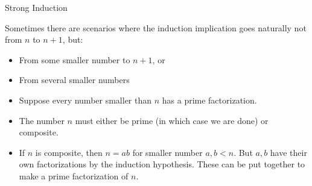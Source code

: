 \documentclass[10pt]{beamer}
\begin{document}
\begin{frame}{Strong Induction}
%

 \begin{myredbox}[title=When to Use Strong Induction]
 Sometimes there are scenarios where the induction implication goes naturally not from $n$ to $n+1$, but:
 \begin{itemize}
 \item From some smaller number to $n+1$, or
 \item From several smaller numbers	
 \end{itemize}
 \end{myredbox}

\vfill 
\pause 
 \begin{myyellowbox}[title=Example: Every positive integer has a prime factorization]
 \begin{itemize}
 \item Suppose every number smaller than $n$ has a prime factorization.
 \item The number $n$ must either be prime (in which case we are done) or composite.
 \item If $n$ is composite, then $n=ab$ for smaller number $a,b<n$.  But $a,b$ have their own  factorizations by the induction hypothesis.  These can be put together to make a prime factorization of $n$.
 \end{itemize}

 \end{myyellowbox}
\end{frame}
\end{document}
